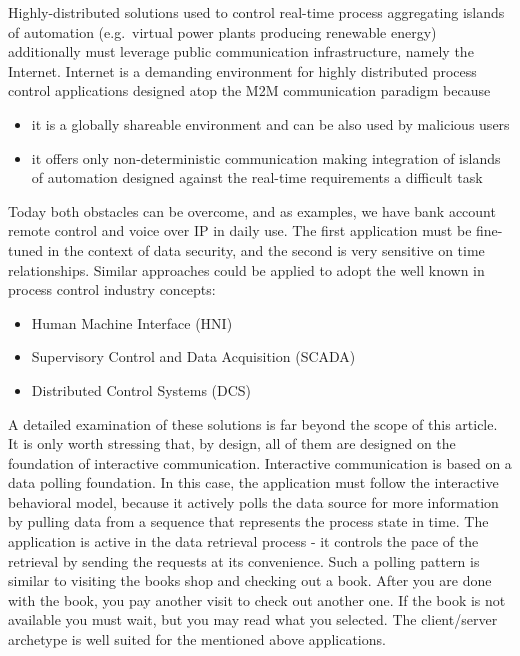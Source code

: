 \documentclass[
]{article}
\providecommand{\tightlist}{%
  \setlength{\itemsep}{0pt}\setlength{\parskip}{0pt}}
\begin{document}
Highly-distributed solutions used to control real-time process
aggregating islands of automation (e.g.~virtual power plants producing
renewable energy) additionally must leverage public communication
infrastructure, namely the Internet. Internet is a demanding environment
for highly distributed process control applications designed atop the
M2M communication paradigm because

\begin{itemize}
\tightlist
\item
  it is a globally shareable environment and can be also used by
  malicious users
\item
  it offers only non-deterministic communication making integration of
  islands of automation designed against the real-time requirements a
  difficult task
\end{itemize}

Today both obstacles can be overcome, and as examples, we have bank
account remote control and voice over IP in daily use. The first
application must be fine-tuned in the context of data security, and the
second is very sensitive on time relationships. Similar approaches could
be applied to adopt the well known in process control industry concepts:

\begin{itemize}
\tightlist
\item
  Human Machine Interface (HNI)
\item
  Supervisory Control and Data Acquisition (SCADA)
\item
  Distributed Control Systems (DCS)
\end{itemize}

A detailed examination of these solutions is far beyond the scope of
this article. It is only worth stressing that, by design, all of them
are designed on the foundation of interactive communication. Interactive
communication is based on a data polling foundation. In this case, the
application must follow the interactive behavioral model, because it
actively polls the data source for more information by pulling data from
a sequence that represents the process state in time. The application is
active in the data retrieval process - it controls the pace of the
retrieval by sending the requests at its convenience. Such a polling
pattern is similar to visiting the books shop and checking out a book.
After you are done with the book, you pay another visit to check out
another one. If the book is not available you must wait, but you may
read what you selected. The client/server archetype is well suited for
the mentioned above applications.
\end{document}
